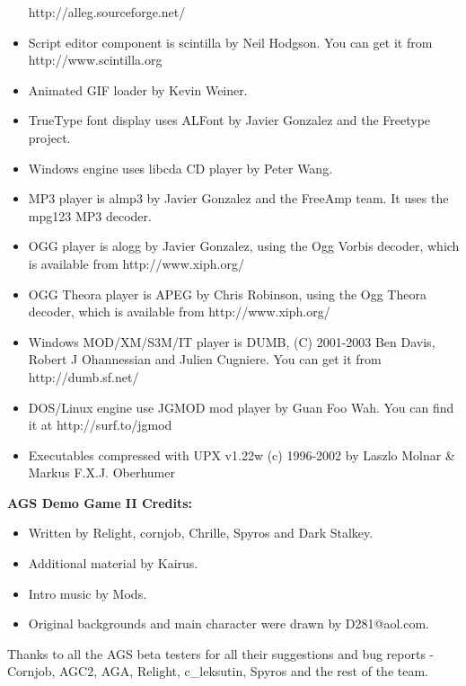 \begin{itemize}
  http://alleg.sourceforge.net/
\item Script editor component is scintilla by Neil Hodgson. You can get it from http://www.scintilla.org
\item Animated GIF loader by Kevin Weiner.
\item TrueType font display uses ALFont by Javier Gonzalez and the Freetype project.
\item Windows engine uses libcda CD player by Peter Wang.
\item MP3 player is almp3 by Javier Gonzalez and the FreeAmp team. It uses the mpg123 MP3 decoder.
\item OGG player is alogg by Javier Gonzalez, using the Ogg Vorbis decoder, which is available
from http://www.xiph.org/
\item OGG Theora player is APEG by Chris Robinson, using the Ogg Theora decoder, which is available
from http://www.xiph.org/
\item Windows MOD/XM/S3M/IT player is DUMB, (C) 2001-2003 Ben Davis, Robert J Ohannessian and Julien Cugniere. You
can get it from http://dumb.sf.net/
\item DOS/Linux engine use JGMOD mod player by Guan Foo Wah. You can find it at
  http://surf.to/jgmod
\item Executables compressed with UPX v1.22w (c) 1996-2002 by Laszlo Molnar & Markus F.X.J. Oberhumer
\end{itemize}

\bf{AGS Demo Game II Credits:}

\begin{itemize}
\item Written by Relight, cornjob, Chrille, Spyros and Dark Stalkey.
\item Additional material by Kairus.
\item Intro music by Mods.
\item Original backgrounds and main character were drawn by D281@aol.com.
\end{itemize}

Thanks to all the AGS beta testers for all their suggestions and bug reports -
Cornjob, AGC2, AGA, Relight, c_leksutin, Spyros and the rest of the team.




